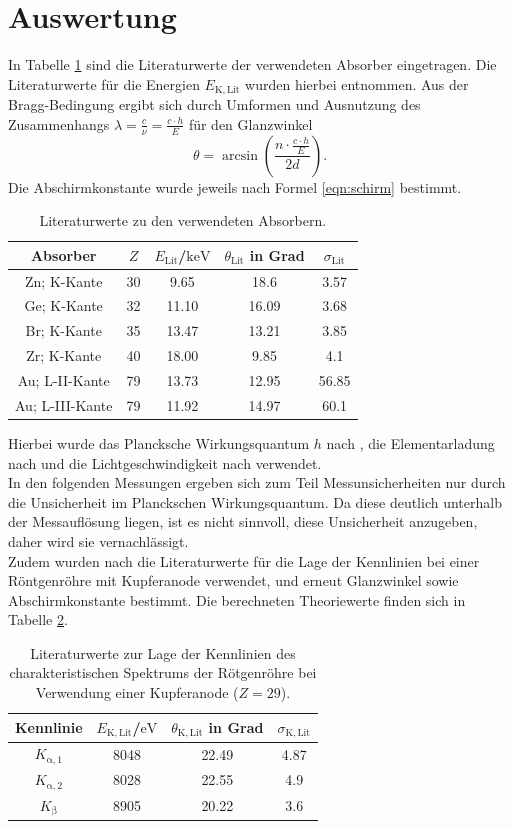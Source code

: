 \section{Auswertung}
\label{sec:Auswertung}
In Tabelle \ref{tab:lit} sind die Literaturwerte der verwendeten Absorber eingetragen.
Die Literaturwerte für die Energien $E_\mathrm{K,Lit}$ wurden hierbei \cite{lit} entnommen.
Aus der Bragg-Bedingung ergibt sich durch Umformen und Ausnutzung des Zusammenhangs $\lambda=\frac{c}{\nu}=\frac{c\cdot h}{E}$ für den Glanzwinkel
\begin{equation}
	\theta=\arcsin{\left(\frac{n\cdot \frac{c\cdot h}{E}}{2d}\right)} \text{.}
\end{equation}
Die Abschirmkonstante wurde jeweils nach Formel \eqref{eqn:schirm} bestimmt.
\begin{table}
	\caption{Literaturwerte zu den verwendeten Absorbern.}
	\label{tab:lit}
	\centering
\begin{tabular}{ccccc}
\toprule
Absorber & $Z$ & $E_\mathrm{Lit}$/$\si{\kilo\electronvolt}$ & $\theta_\mathrm{Lit}$ in Grad&$\sigma_\mathrm{Lit}$ \\
\midrule
Zn; K-Kante&30 & 9.65 & 18.6 & 3.57 \\
Ge; K-Kante&32 & 11.10 & 16.09 & 3.68 \\
Br; K-Kante&35 & 13.47& 13.21 & 3.85 \\
Zr; K-Kante&40 & 18.00 & 9.85 & 4.1 \\
Au; L-II-Kante&79 & 13.73 & 12.95 & 56.85 \\
Au; L-III-Kante&79 & 11.92 & 14.97 & 60.1 \\
\bottomrule
\end{tabular}
\end{table}
Hierbei wurde das Plancksche Wirkungsquantum $h$ nach \cite{h}, die Elementarladung nach \cite{e} und die Lichtgeschwindigkeit nach \cite{c} verwendet.\\
In den folgenden Messungen ergeben sich zum Teil Messunsicherheiten nur durch die Unsicherheit im Planckschen Wirkungsquantum. Da diese deutlich unterhalb der Messauflösung liegen, ist es nicht sinnvoll, diese Unsicherheit anzugeben, daher wird sie vernachlässigt.\\
Zudem wurden nach \cite{UniG} die Literaturwerte für die Lage der Kennlinien bei einer Röntgenröhre mit Kupferanode verwendet, und erneut Glanzwinkel sowie Abschirmkonstante bestimmt. Die berechneten Theoriewerte finden sich in Tabelle \ref{tab:tab2}.
\begin{table}
	\caption{Literaturwerte zur Lage der Kennlinien des charakteristischen Spektrums der Rötgenröhre bei Verwendung einer Kupferanode ($Z=29$).}
\label{tab:tab2}
	\centering
\begin{tabular}{cccc}
\toprule
 Kennlinie& $E_\mathrm{K,Lit}$/$\si{\electronvolt}$ & $\theta_\mathrm{K,Lit}$ in Grad&$\sigma_\mathrm{K,Lit}$ \\
\midrule
$K_\mathrm{\alpha,1}$& 8048& 22.49 & 4.87 \\
$K_\mathrm{\alpha,2}$& 8028& 22.55 & 4.9 \\
$K_\mathrm{\beta}$& 8905& 20.22 & 3.6 \\
\bottomrule
\end{tabular}
\end{table}


